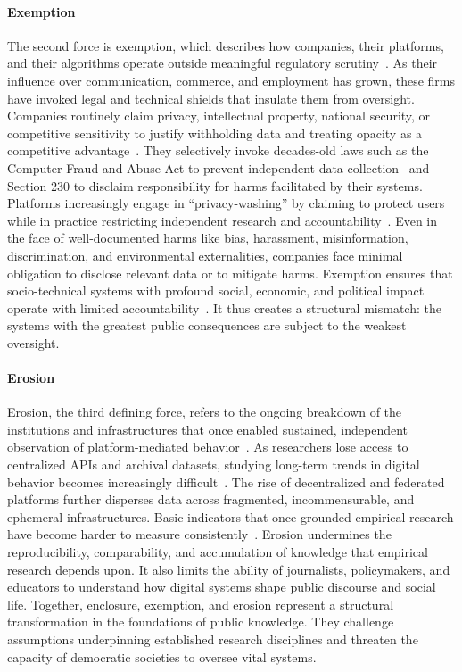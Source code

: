 \documentclass[acmsmall,screen]{acmart}
\begin{document}
\paragraph*{Exemption}
The second force is exemption, which describes how companies, their platforms, and their algorithms operate outside meaningful regulatory scrutiny~\cite{suzor2018digital}. As their influence over communication, commerce, and employment has grown, these firms have invoked legal and technical shields that insulate them from oversight. Companies routinely claim privacy, intellectual property, national security, or competitive sensitivity to justify withholding data and treating opacity as a competitive advantage~\cite{suzor2018digital,obar2020biggest}. They selectively invoke decades-old laws such as the Computer Fraud and Abuse Act to prevent independent data collection~\cite{ACLU_Sandvig_2019} and Section 230 to disclaim responsibility for harms facilitated by their systems. Platforms increasingly engage in ``privacy-washing'' by claiming to protect users while in practice restricting independent research and accountability~\cite{obar2020biggest,van_der_vlist_api_2022}. Even in the face of well-documented harms like bias, harassment, misinformation, discrimination, and environmental externalities, companies face minimal obligation to disclose relevant data or to mitigate harms. Exemption ensures that socio-technical systems with profound social, economic, and political impact operate with limited accountability~\cite{suzor2018digital}. It thus creates a structural mismatch: the systems with the greatest public consequences are subject to the weakest oversight.

\paragraph*{Erosion}
Erosion, the third defining force, refers to the ongoing breakdown of the institutions and infrastructures that once enabled sustained, independent observation of platform-mediated behavior~\cite{Plantin_Infrastructurestudiesmeet_2016}. As researchers lose access to centralized APIs and archival datasets, studying long-term trends in digital behavior becomes increasingly difficult~\cite{Freelon_ComputationalResearchPostAPI_2018}. The rise of decentralized and federated platforms further disperses data across fragmented, incommensurable, and ephemeral infrastructures. Basic indicators that once grounded empirical research have become harder to measure consistently~\cite{Bruns_APIcalypsesocialmedia_2019,nicholson_truthiness_2024}. Erosion undermines the reproducibility, comparability, and accumulation of knowledge that empirical research depends upon. It also limits the ability of journalists, policymakers, and educators to understand how digital systems shape public discourse and social life. Together, enclosure, exemption, and erosion represent a structural transformation in the foundations of public knowledge. They challenge assumptions underpinning established research disciplines and threaten the capacity of democratic societies to oversee vital systems.
\end{document}
